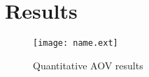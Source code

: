 \graphicspath{ {./content/results/figures/} }

\section{Results} 

\begin{figure}[h]
  \centering
  
  \texttt{[image: name.ext]}
  \caption{Quantitative AOV results}
  \label{fig:surveyResults}
\end{figure}

